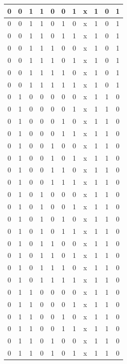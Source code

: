 \documentclass[conference]{IEEEtran}
\begin{document}
\begin{table}[htbp]
\begin{center}
\begin{tabular}{|c|c|c|c|c|c|c|c|c|c|c|}
\hline
0 & 0 & 1 & 1 & 0 & 0 & 1 & x & 1 & 0 & 1 \\
\hline
0 & 0 & 1 & 1 & 0 & 1 & 0 & x & 1 & 0 & 1 \\
\hline
0 & 0 & 1 & 1 & 0 & 1 & 1 & x & 1 & 0 & 1 \\
\hline
0 & 0 & 1 & 1 & 1 & 0 & 0 & x & 1 & 0 & 1 \\
\hline
0 & 0 & 1 & 1 & 1 & 0 & 1 & x & 1 & 0 & 1 \\
\hline
0 & 0 & 1 & 1 & 1 & 1 & 0 & x & 1 & 0 & 1 \\
\hline
0 & 0 & 1 & 1 & 1 & 1 & 1 & x & 1 & 0 & 1 \\
\hline
0 & 1 & 0 & 0 & 0 & 0 & 0 & x & 1 & 1 & 0 \\
\hline
0 & 1 & 0 & 0 & 0 & 0 & 1 & x & 1 & 1 & 0 \\
\hline
0 & 1 & 0 & 0 & 0 & 1 & 0 & x & 1 & 1 & 0 \\
\hline
0 & 1 & 0 & 0 & 0 & 1 & 1 & x & 1 & 1 & 0 \\
\hline
0 & 1 & 0 & 0 & 1 & 0 & 0 & x & 1 & 1 & 0 \\
\hline
0 & 1 & 0 & 0 & 1 & 0 & 1 & x & 1 & 1 & 0 \\
\hline
0 & 1 & 0 & 0 & 1 & 1 & 0 & x & 1 & 1 & 0 \\
\hline
0 & 1 & 0 & 0 & 1 & 1 & 1 & x & 1 & 1 & 0 \\
\hline
0 & 1 & 0 & 1 & 0 & 0 & 0 & x & 1 & 1 & 0 \\
\hline
0 & 1 & 0 & 1 & 0 & 0 & 1 & x & 1 & 1 & 0 \\
\hline
0 & 1 & 0 & 1 & 0 & 1 & 0 & x & 1 & 1 & 0 \\
\hline
0 & 1 & 0 & 1 & 0 & 1 & 1 & x & 1 & 1 & 0 \\
\hline
0 & 1 & 0 & 1 & 1 & 0 & 0 & x & 1 & 1 & 0 \\
\hline
0 & 1 & 0 & 1 & 1 & 0 & 1 & x & 1 & 1 & 0 \\
\hline
0 & 1 & 0 & 1 & 1 & 1 & 0 & x & 1 & 1 & 0 \\
\hline
0 & 1 & 0 & 1 & 1 & 1 & 1 & x & 1 & 1 & 0 \\
\hline
0 & 1 & 1 & 0 & 0 & 0 & 0 & x & 1 & 1 & 0 \\
\hline
0 & 1 & 1 & 0 & 0 & 0 & 1 & x & 1 & 1 & 0 \\
\hline
0 & 1 & 1 & 0 & 0 & 1 & 0 & x & 1 & 1 & 0 \\
\hline
0 & 1 & 1 & 0 & 0 & 1 & 1 & x & 1 & 1 & 0 \\
\hline
0 & 1 & 1 & 0 & 1 & 0 & 0 & x & 1 & 1 & 0 \\
\hline
0 & 1 & 1 & 0 & 1 & 0 & 1 & x & 1 & 1 & 0 \\

\end{tabular}
\end{center}
\end{table}
\end{document}
